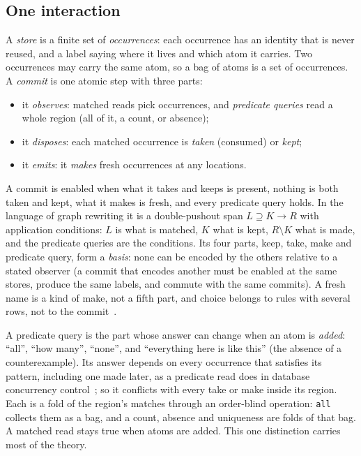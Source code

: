 \documentclass[11pt]{article}
\newcommand{\code}[1]{\texttt{#1}}
\begin{document}
\subsection{One interaction}

A \emph{store} is a finite set of \emph{occurrences}: each occurrence has an
identity that is never reused, and a label saying where it lives and which atom
it carries.  Two occurrences may carry the same atom, so a bag of atoms is a
set of occurrences.  A \emph{commit} is one atomic step with three parts:

\begin{itemize}
\item it \emph{observes}: matched reads pick occurrences, and \emph{predicate
  queries} read a whole region (all of it, a count, or absence);
\item it \emph{disposes}: each matched occurrence is \emph{taken} (consumed) or
  \emph{kept};
\item it \emph{emits}: it \emph{makes} fresh occurrences at any locations.
\end{itemize}

\noindent
A commit is enabled when what it takes and keeps is present, nothing is both
taken and kept, what it makes is fresh, and every predicate query holds.  In the
language of graph rewriting it is a double-pushout span
$L \supseteq K \rightarrow R$ with application conditions: $L$ is what is
matched, $K$ what is kept, $R\setminus K$ what is made, and the predicate queries
are the conditions.  Its four parts, keep, take, make and predicate query, form a
\emph{basis}: none can be encoded by the others relative to a stated observer
(a commit that encodes another must be enabled at the same stores, produce the
same labels, and commute with the same commits).  A fresh name is a kind of
make, not a fifth part, and choice belongs to rules with several rows, not to
the commit~\cite{interaction-basis}.

A predicate query is the part whose answer can change when an atom is
\emph{added}: ``all'', ``how many'', ``none'', and ``everything here is like
this'' (the absence of a counterexample).  Its answer depends on every
occurrence that satisfies its pattern, including one made later, as a predicate
read does in database concurrency control~\cite{predicate-locks}; so it
conflicts with every take or make inside its region.  Each is a fold of the
region's matches through an order-blind operation: \code{all} collects them as a
bag, and a count, absence and uniqueness are folds of that bag.  A matched read
stays true when atoms are added.  This one distinction carries most of the
theory.
\end{document}
